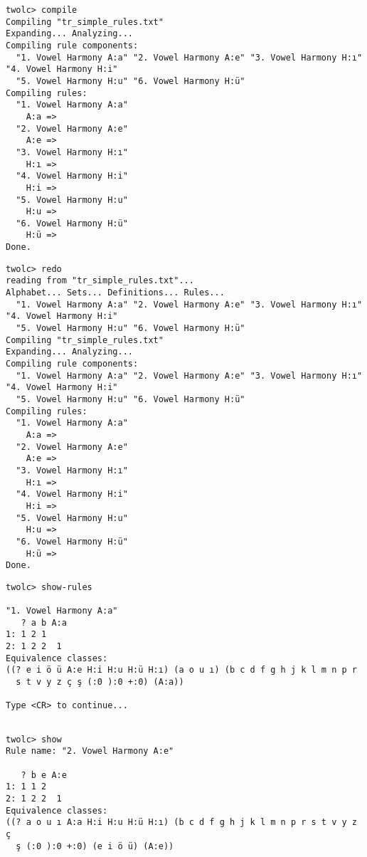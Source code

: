 \documentclass[11pt,a4paper]{article}
\begin{document}
\begin{lstlisting}[caption={Compile rules}, belowskip=1em,frame=single]
twolc> compile
Compiling "tr_simple_rules.txt"
Expanding... Analyzing...
Compiling rule components:
  "1. Vowel Harmony A:a" "2. Vowel Harmony A:e" "3. Vowel Harmony H:ı" "4. Vowel Harmony H:i"
  "5. Vowel Harmony H:u" "6. Vowel Harmony H:ü"
Compiling rules:
  "1. Vowel Harmony A:a"
    A:a =>
  "2. Vowel Harmony A:e"
    A:e =>
  "3. Vowel Harmony H:ı"
    H:ı =>
  "4. Vowel Harmony H:i"
    H:i =>
  "5. Vowel Harmony H:u"
    H:u =>
  "6. Vowel Harmony H:ü"
    H:ü =>
Done.
\end{lstlisting}

\newpage

\begin{lstlisting}[title={Read and compile with single command if you update your rules}, belowskip=1em,frame=single]
twolc> redo
reading from "tr_simple_rules.txt"...
Alphabet... Sets... Definitions... Rules...
  "1. Vowel Harmony A:a" "2. Vowel Harmony A:e" "3. Vowel Harmony H:ı" "4. Vowel Harmony H:i"
  "5. Vowel Harmony H:u" "6. Vowel Harmony H:ü"
Compiling "tr_simple_rules.txt"
Expanding... Analyzing...
Compiling rule components:
  "1. Vowel Harmony A:a" "2. Vowel Harmony A:e" "3. Vowel Harmony H:ı" "4. Vowel Harmony H:i"
  "5. Vowel Harmony H:u" "6. Vowel Harmony H:ü"
Compiling rules:
  "1. Vowel Harmony A:a"
    A:a =>
  "2. Vowel Harmony A:e"
    A:e =>
  "3. Vowel Harmony H:ı"
    H:ı =>
  "4. Vowel Harmony H:i"
    H:i =>
  "5. Vowel Harmony H:u"
    H:u =>
  "6. Vowel Harmony H:ü"
    H:ü =>
Done.
\end{lstlisting}



\begin{lstlisting}[title={You can also see the transition table for your rules},belowskip=1em,frame=single]
twolc> show-rules

"1. Vowel Harmony A:a"
   ? a b A:a 
1: 1 2 1     
2: 1 2 2  1  
Equivalence classes:
((? e i ö ü A:e H:i H:u H:ü H:ı) (a o u ı) (b c d f g h j k l m n p r
  s t v y z ç ş (:0 ):0 +:0) (A:a))

Type <CR> to continue...
\end{lstlisting}

\begin{lstlisting}[title={Also check for individual rules by providing their names}, belowskip=1em,frame=single]

twolc> show
Rule name: "2. Vowel Harmony A:e"

   ? b e A:e 
1: 1 1 2     
2: 1 2 2  1  
Equivalence classes:
((? a o u ı A:a H:i H:u H:ü H:ı) (b c d f g h j k l m n p r s t v y z ç
  ş (:0 ):0 +:0) (e i ö ü) (A:e))

\end{lstlisting}
\end{document}

